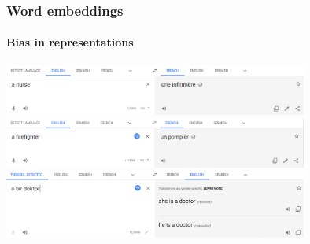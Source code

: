 \documentclass[9pt]{beamer}
\begin{document}
\begin{frame}
  \frametitle{Word embeddings}

  \framesubtitle{Bias in representations}

  \begin{center}
    \includegraphics[width = 10cm]{images/nurse.png} \\[.5cm]
    \includegraphics[width = 10cm]{images/firefighter.png} \\[.5cm]
    \includegraphics[width = 10cm]{images/doctor.png}
  \end{center}
\end{frame}
\end{document}

